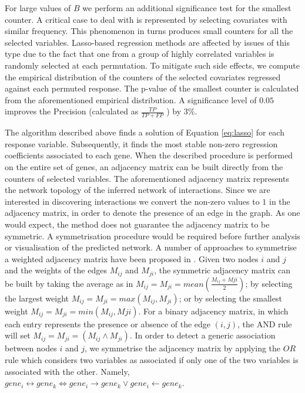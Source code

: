 For large values of $B$ we perform an additional significance test for the smallest  counter. A critical case to deal with is represented by selecting covariates with similar frequency. This phenomenon in turns produces small counters for all the  selected variables. Lasso-based regression methods are affected by issues of this type due to the fact that one from a group of highly correlated variables is randomly selected at each permutation. To mitigate such side effects, we compute the empirical distribution of the counters of the selected covariates regressed against each permuted response. The p-value of the smallest counter is calculated from the aforementioned empirical distribution. A significance level of $0.05$ improves the Precision (calculated as $\frac{TP}{TP+FP}$ ) by $3\%$.

The algorithm described above finds a solution of Equation \ref{eq:lasso} for each response variable. Subsequently, it finds the most stable non-zero regression coefficients associated to each gene. 
When the described procedure is performed on the entire set of genes, an adjacency matrix can be built directly from the counters of selected variables. The aforementioned adjacency matrix represents the network topology of the inferred network of interactions. 
Since we are interested in discovering interactions we convert the non-zero values to $1$ in the adjacency matrix, in order to denote the presence of an edge in the graph.
As one would expect, the method does not guarantee the adjacency matrix to be symmetric. A symmetrisation procedure would be required before further analysis or visualisation of the predicted network. 
A number of approaches to symmetrise a weighted adjacency matrix have been proposed in \citealp{wna}. Given two nodes $i$ and $j$ and the weights of the edges $M_{ij}$ and $M_{ji}$, the symmetric adjacency matrix can be built by taking the average as in $M_{ij} = M_{ji} = mean(\frac{M_{ij}+M{ji}}{2})$; by selecting the largest weight $M_{ij} = M_{ji} = max(M_{ij}, M_{ji})$; or by selecting the smallest weight  $M_{ij} = M_{ji} = min(M_{ij}, M{ji})$. For a binary adjacency matrix, in which each entry represents the presence or absence of the edge $(i,j)$, the AND rule will set $M_{ij} = M_{ji} = (M_{ij} \land M_{ji})$.
In order to detect a generic association between nodes $i$ and $j$, we symmetrise the adjacency matrix by applying the $OR$ rule which considers two variables as associated if only one of the two variables is associated with the other. Namely, $gene_i \leftrightarrow gene_k \iff gene_i \rightarrow gene_k \vee gene_i \leftarrow gene_k $.

